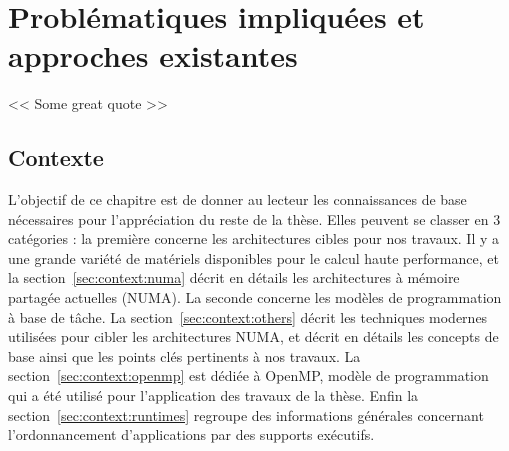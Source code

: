 \part{Problématiques impliquées et approches existantes}

\begin{savequote}[6cm]
<< Some great quote  >>
\end{savequote}
\chapter{Contexte}\label{chap:contexte}
\chaptertoc

\pagebreak

L'objectif de ce chapitre est de donner au lecteur les connaissances de base nécessaires pour l'appréciation du reste de la thèse.
Elles peuvent se classer en 3 catégories : la première concerne les architectures cibles pour nos travaux. Il y a une grande variété de matériels disponibles pour le calcul haute performance, et la section~\ref{sec:context:numa} décrit en détails les architectures à mémoire partagée actuelles (NUMA).
La seconde concerne les modèles de programmation à base de tâche. La section~\ref{sec:context:others} décrit les techniques modernes utilisées pour cibler les architectures NUMA, et décrit en détails les concepts de base ainsi que les points clés pertinents à nos travaux. La section~\ref{sec:context:openmp} est dédiée à OpenMP, modèle de programmation qui a été utilisé pour l'application des travaux de la thèse.
Enfin la section~\ref{sec:context:runtimes} regroupe des informations générales concernant l'ordonnancement d'applications par des supports exécutifs.







